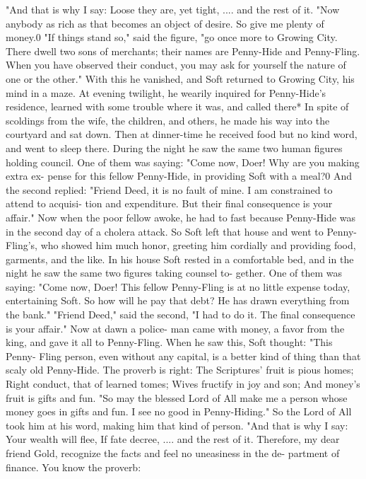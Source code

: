 \documentclass{book}
\begin{document}
"And that is why I say:
Loose they are, yet tight, ....
and the rest of it.
"Now anybody as rich as that becomes an object
of desire. So give me plenty of money.0
"If things stand so," said the figure, "go once more
to Growing City. There dwell two sons of merchants;
their names are Penny-Hide and Penny-Fling. When
you have observed their conduct, you may ask for
yourself the nature of one or the other." With this
he vanished, and Soft returned to Growing City, his
mind in a maze.
At evening twilight, he wearily inquired for
Penny-Hide's residence, learned with some trouble
where it was, and called there* In spite of scoldings
from the wife, the children, and others, he made his
way into the courtyard and sat down. Then at
dinner-time he received food but no kind word, and
went to sleep there.
During the night he saw the same two human
figures holding council. One of them was saying:
"Come now, Doer! Why are you making extra ex-
pense for this fellow Penny-Hide, in providing Soft
with a meal?0
And the second replied: "Friend Deed, it is no
fault of mine. I am constrained to attend to acquisi-
tion and expenditure. But their final consequence is
your affair." Now when the poor fellow awoke, he
had to fast because Penny-Hide was in the second day
of a cholera attack.
So Soft left that house and went to Penny-Fling's,
who showed him much honor, greeting him cordially
and providing food, garments, and the like. In his
house Soft rested in a comfortable bed, and in the
night he saw the same two figures taking counsel to-
gether. One of them was saying: "Come now, Doer!
This fellow Penny-Fling is at no little expense today,
entertaining Soft. So how will he pay that debt? He
has drawn everything from the bank." "Friend
Deed," said the second, "I had to do it. The final
consequence is your affair." Now at dawn a police-
man came with money, a favor from the king, and
gave it all to Penny-Fling.
When he saw this, Soft thought: "This Penny-
Fling person, even without any capital, is a better
kind of thing than that scaly old Penny-Hide. The
proverb is right:
The Scriptures' fruit is pious homes;
Right conduct, that of learned tomes;
Wives fructify in joy and son;
And money's fruit is gifts and fun.
"So may the blessed Lord of All make me a person
whose money goes in gifts and fun. I see no good in
Penny-Hiding."
So the Lord of All took him at his word, making
him that kind of person.
"And that is why I say:
Your wealth will flee,
If fate decree, ....
and the rest of it. Therefore, my dear friend Gold,
recognize the facts and feel no uneasiness in the de-
partment of finance. You know the proverb:
\end{document}

